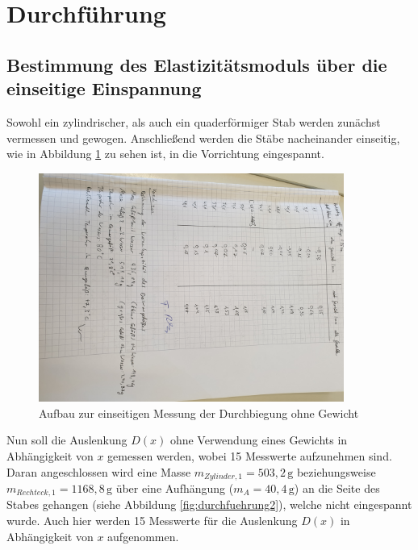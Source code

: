 \section{Durchführung}
\label{sec:Durchführung}

\subsection{Bestimmung des Elastizitätsmoduls über die einseitige Einspannung}

Sowohl ein zylindrischer, als auch ein quaderförmiger Stab werden zunächst vermessen und gewogen.
Anschließend werden die Stäbe nacheinander einseitig, wie in Abbildung \ref{fig:durchfuehrung1} 
zu sehen ist, in die Vorrichtung eingespannt. 

\begin{figure}[H]
    \centering
    \includegraphics[width=10cm]{1.jpg}
    \caption{Aufbau zur einseitigen Messung der Durchbiegung ohne Gewicht}
    \label{fig:durchfuehrung1}
\end{figure}
\noindent
Nun soll die Auslenkung $D(x)$ ohne Verwendung eines Gewichts in 
Abhängigkeit von $x$ gemessen werden, wobei 15 Messwerte aufzunehmen sind. Daran angeschlossen
wird eine Masse $m_{Zylinder,1} = 503,2\, \si{\gram}$ beziehungsweise 
$m_{Rechteck,1} = 1168,8\, \si{\gram}$ über eine Aufhängung ($m_{A} = 40,4\, \si{\gram}$) 
an die Seite des Stabes gehangen (siehe Abbildung \ref{fig:durchfuehrung2}), welche 
nicht eingespannt wurde. Auch hier werden 15 Messwerte für die Auslenkung $D(x)$ in 
Abhängigkeit von $x$ aufgenommen. 

